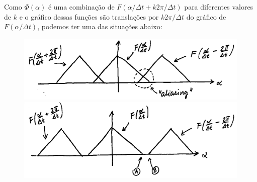 Como $\Phi(\alpha)$ é uma combinação de $F(\alpha / \Delta t + k 2 \pi / \Delta
t)$ para diferentes valores de $k$ e o gráfico dessas funções são translações
por $k 2 \pi / \Delta t$ do gráfico de $F(\alpha / \Delta t)$, podemos ter uma
das situações abaixo:
\begin{figure}[htb]
  \centering
  \includegraphics{figuras/12-1} \\
  \includegraphics{figuras/12-2}
\end{figure}

